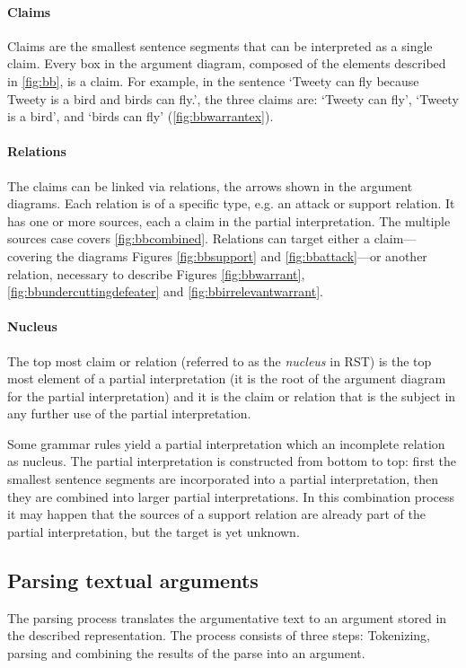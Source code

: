 \paragraph{Claims} Claims are the smallest sentence segments that can be interpreted as a single claim. Every box in the argument diagram, composed of the elements described in \autoref{fig:bb}, is a claim. For example, in the sentence `Tweety can fly because Tweety is a bird and birds can fly.', the three claims are: `Tweety can fly', `Tweety is a bird', and `birds can fly' (\autoref{fig:bbwarrantex}).

\paragraph{Relations} The claims can be linked via relations, the arrows shown in the argument diagrams. Each relation is of a specific type, e.g. an attack or support relation. It has one or more sources, each a claim in the partial interpretation. The multiple sources case covers \autoref{fig:bbcombined}. Relations can target either a claim---covering the diagrams Figures \ref{fig:bbsupport} and \ref{fig:bbattack}---or another relation, necessary to describe Figures \ref{fig:bbwarrant}, \ref{fig:bbundercuttingdefeater} and \ref{fig:bbirrelevantwarrant}.

\paragraph{Nucleus} The top most claim or relation (referred to as the \emph{nucleus} in RST) is the top most element of a partial interpretation (it is the root of the argument diagram for the partial interpretation) and it is the claim or relation that is the subject in any further use of the partial interpretation.

Some grammar rules yield a partial interpretation which an incomplete relation as nucleus. The partial interpretation is constructed from bottom to top: first the smallest sentence segments are incorporated into a partial interpretation, then they are combined into larger partial interpretations. In this combination process it may happen that the sources of a support relation are already part of the partial interpretation, but the target is yet unknown.

\subsection{Parsing textual arguments}
The parsing process translates the argumentative text to an argument stored in the described representation. The process consists of three steps: Tokenizing, parsing and combining the results of the parse into an argument.

